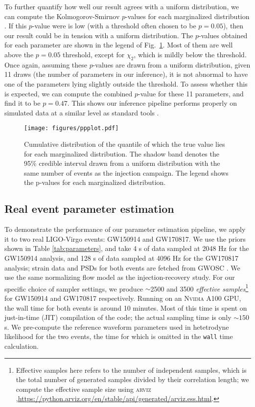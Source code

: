 \documentclass[twocolumn]{aastex631}
\begin{document}
To further quantify how well our result agrees with a uniform distribution, we
can compute the Kolmogorov-Smirnov $p$-values for each marginalized
distribution \cite{}.  If this $p$-value were is low (with a threshold often
chosen to be $p = 0.05$), then our result could be in tension with a uniform
distribution. The $p$-values obtained for each parameter are shown in the
legend of Fig.~\ref{fig:ppplot}.  Most of them are well above the $p = 0.05$
threshold, except for $\chi_2$, which is mildly below the threshold. Once
again, assuming these $p$-values are drawn from a uniform distribution, given
11 draws (the number of parameters in our inference), it is not abnormal to
have one of the parameters lying slightly outside the threshold. To assess
whether this is expected, we can compute the combined $p$-value for these 11
parameters, and find it to be $p = 0.47$.  This shows our inference pipeline
performs properly on simulated data at a similar level as standard tools
\cite{Veitch:2014wba,Romero-Shaw:2020owr}.

\begin{figure}
    \texttt{[image: figures/ppplot.pdf]}
    \caption{Cumulative distribution of the quantile of which the true value
    lies for each marginalized distribution. The shadow band denotes the 95\%
    credible interval drawn from a uniform distribution with the same number of
    events as the injection campaign. The legend shows the p-values for each
    marginalized distribution.}
    \label{fig:ppplot}
\end{figure}

\subsection{Real event parameter estimation}

To demonstrate the performance of our parameter estimation pipeline, we apply it
to two real LIGO-Virgo events: GW150914 and GW170817. We use the priors shown in
Table \ref{tab:parameters}, and take 4 s of data sampled at 2048 Hz for the
GW150914 analysis, and 128 s of data sampled at 4096 Hz for the GW170817
analysis; strain data and PSDs for both events are fetched from GWOSC
\cite{GWOSC}. We use the same normalizing flow model as the injection-recovery
study. For our specific choice of sampler settings, we produce ${\sim}$2500 and
3500 \emph{effective samples}\footnote{Effective samples here refers to the
number of independent samples, which is the total number of generated samples
divided by their correlation length; we compute the effective sample size using
\textsc{arviz}
\cite{arviz_2019},\url{https://python.arviz.org/en/stable/api/generated/arviz.ess.html}.
} for GW150914 and GW170817 respectively. Running on an \textsc{Nvidia} A100
GPU, the wall time for both events is around 10 minutes. Most of this time is
spent on just-in-time (JIT) compilation of the code; the actual sampling time is
only ${\sim}150$ s. We pre-compute the reference waveform parameters used in
hetetrodyne likelihood for the two events, the time for which is omitted in the
\texttt{wall} time calculation.
\end{document}
